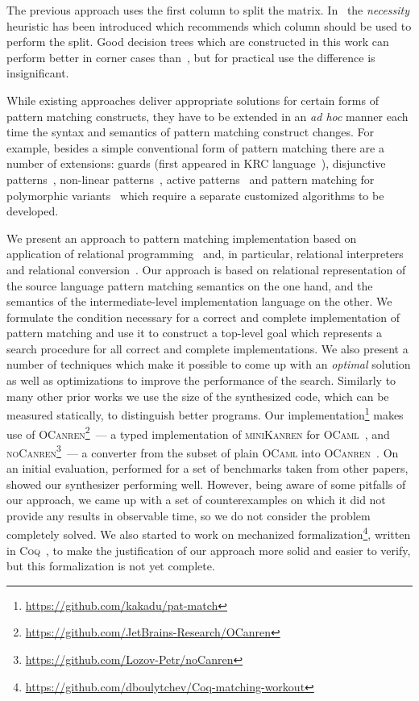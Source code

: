 The previous approach uses the first column to split the matrix. In~\cite{maranget2008} the \emph{necessity} heuristic has been introduced which recommends which column should be
used to perform the split. Good decision trees which are constructed in this work can perform better in corner cases than~\cite{maranget2001}, but for practical use the
difference is insignificant.

While existing approaches deliver appropriate solutions for certain forms of pattern matching constructs, they have to be extended in an \emph{ad hoc} manner each time
the syntax and semantics of pattern matching construct changes. For example, besides a simple conventional form of pattern matching there are a number of extensions:
guards (first appeared in KRC language~\cite{turner2013}), disjunctive patterns~\cite{ocaml}, non-linear patterns~\cite{mcbride1969symbol}, active patterns~\cite{activepatterns} and pattern matching for polymorphic variants~\cite{Garrigue98} 
which require a separate customized algorithms to be developed.

We present an approach to pattern matching implementation based on application of relational programming~\cite{TRS,WillThesis} and, in particular, relational interpreters~\cite{unified}
and relational conversion~\cite{conversion}. Our approach is based on relational representation of the source language pattern matching semantics on the one hand, and
the semantics of the intermediate-level implementation language on the other. We formulate the condition necessary for a correct and complete implementation of pattern matching and use it to
construct a top-level goal which represents a search procedure for all correct and complete implementations. We also present a number of techniques which make it possible to come up with an
\emph{optimal} solution as well as optimizations to improve the performance of the search. Similarly to many other prior works we use the size of the synthesized code, which can be measured statically, to distinguish better programs.
Our implementation\footnote{\url{https://github.com/kakadu/pat-match}} makes use of \textsc{OCanren}\footnote{\url{https://github.com/JetBrains-Research/OCanren}}~--- a typed
implementation of \textsc{miniKanren} for \textsc{OCaml}~\cite{OCanren}, and \textsc{noCanren}\footnote{\url{https://github.com/Lozov-Petr/noCanren}}~--- a converter from the subset
of plain \textsc{OCaml} into \textsc{OCanren}~\cite{conversion}. On an initial  evaluation, performed for a set of benchmarks taken from other papers, showed our synthesizer performing well.
However, being aware of some pitfalls of our approach, we came up with a set of counterexamples on which it did not provide any results in observable time, so we do not consider the problem
completely solved. We also started to work on mechanized formalization\footnote{\url{https://github.com/dboulytchev/Coq-matching-workout}}, written in \textsc{Coq}~\cite{Coq}, to
make the justification of our approach more solid and easier to verify, but this formalization is not yet complete. 

 

